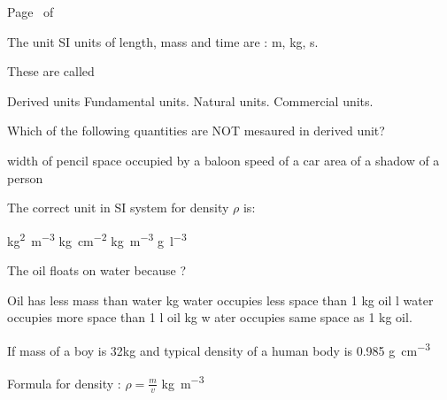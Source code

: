 \documentclass[12pt,addpoints]{exam}
\begin{document}
\pagestyle{headandfoot} \extraheadheight{.25in}
\footer{} {Page \thepage\ of \numpages} {}

\begin{questions}




\myquestion[1] The unit SI units of length, mass and time are :
\unit{\metre}, \unit{\kilo\gram}, \unit{\second}.

These are called
	\begin{choices}
	\choice Derived units
	\CorrectChoice Fundamental units.
	\choice Natural units.
	\choice Commercial units.
	\end{choices}


\myquestion[1] Which of the following quantities are NOT mesaured  in derived unit?

	\begin{choices}
	\correctchoice width of pencil
	\choice space occupied by a baloon
	\choice speed of a car
	\choice area of a shadow of a person
	\end{choices}


\myquestion[1] The correct unit in SI system for density $\rho$ is:

	\begin{choices}
	  \choice \unit{\kg^2\per\metre^3}
	  \choice \unit{\kg\per\centi\metre^2}
	\CorrectChoice \unit{\kg\per\m^3}
	\choice \unit{\g\per\litre^3}
	\end{choices}


\myquestion[1] The oil floats on water because ?
 \begin{choices}
   \choice Oil has less mass than water
    \unit{\kg} water occupies less space than 1 \unit{\kg} oil
    \unit{\l} water occupies more space than 1 \unit{\l} oil
    \unit{\kg} w ater occupies same space as 1 \unit{\kg} oil.
\end{choices}

\myquestion If mass of a boy is 32\unit{\kg} and typical density of a human body is 0.985 \unit{\g\per\cm^3}

Formula for density :  $\rho = \frac{m}{v}$ \unit{\kg\per\m^{3}}
\end{questions}
\end{document}
